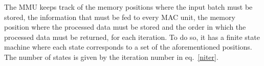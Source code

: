 \documentclass[conference,compsoc]{IEEEtran}
\begin{document}
The MMU keeps track of the memory positions where the input batch must be stored,
the information that must be fed to every MAC unit, the memory position where
the processed data must be stored and the order in which the processed data must
be returned, for each iteration. To do so, it has a finite state machine where
each state corresponds to a set of the aforementioned positions. The number of states
is given by the iteration number in eq.~\eqref{niter}.


\begin{figure}[!t]
\centering
{}
\hfil %
\centering
{}
\end{figure}
\end{document}
